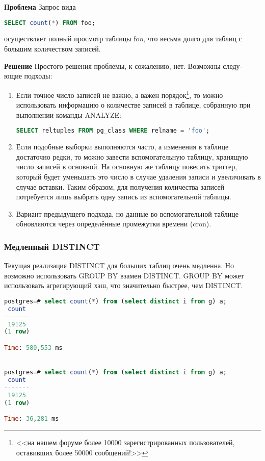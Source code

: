 \textbf{Проблема} Запрос вида
\begin{lstlisting}[language=SQL,label=lst:sql_performance1,caption=SQL]
SELECT count(*) FROM foo;
\end{lstlisting}
осуществляет полный просмотр таблицы foo, что весьма долго для таблиц с большим количеством записей.

\textbf{Решение} Простого решения проблемы, к сожалению, нет. Возможны следу-
ющие подходы:
\begin{enumerate}
\item Если точное число записей не важно, а важен порядок\footnote{<<на нашем форуме более 10000 зарегистрированных 
пользователей, оставивших более 50000 сообщений!>>}, то можно использовать информацию о количестве 
записей в таблице, собранную при выполнении команды ANALYZE:
\begin{lstlisting}[language=SQL,label=lst:sql_performance2,caption=SQL]
SELECT reltuples FROM pg_class WHERE relname = 'foo';
\end{lstlisting}
\item Если подобные выборки выполняются часто, а изменения в таблице достаточно редки, то можно завести вспомогательную 
таблицу, хранящую число записей в основной. На основную же таблицу повесить триггер, который будет уменьшать это число 
в случае удаления записи и увеличивать в случае вставки. Таким образом, для получения количества записей потребуется лишь 
выбрать одну запись из вспомогательной таблицы.
\item Вариант предыдущего подхода, но данные во вспомогательной таблице обновляются через определённые промежутки времени (cron).
\end{enumerate}

\subsubsection{Медленный DISTINCT}
Текущая реализация DISTINCT для больших таблиц очень медленна. Но возможно использовать GROUP BY взамен DISTINCT. 
GROUP BY может использовать агрегирующий хэш, что значительно быстрее, чем DISTINCT.

\begin{lstlisting}[language=SQL,label=lst:sql_performance3,caption=DISTINCT]
postgres=# select count(*) from (select distinct i from g) a;
 count 
-------
 19125
(1 row)

Time: 580,553 ms


postgres=# select count(*) from (select distinct i from g) a;
 count 
-------
 19125
(1 row)

Time: 36,281 ms
\end{lstlisting}

